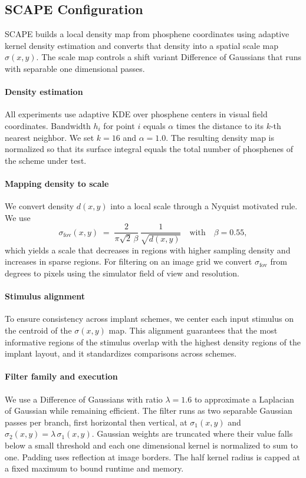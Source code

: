 \subsection{SCAPE Configuration}
SCAPE builds a local density map from phosphene coordinates using adaptive kernel density estimation and converts that density into a spatial scale map \(\sigma(x,y)\). The scale map controls a shift variant Difference of Gaussians that runs with separable one dimensional passes.

\paragraph{Density estimation}
All experiments use adaptive KDE over phosphene centers in visual field coordinates. Bandwidth \(h_i\) for point \(i\) equals \(\alpha\) times the distance to its \(k\)-th nearest neighbor. We set \(k=16\) and \(\alpha=1.0\). The resulting density map is normalized so that its surface integral equals the total number of phosphenes of the scheme under test.

\paragraph{Mapping density to scale}
We convert density \(d(x,y)\) into a local scale through a Nyquist motivated rule. We use
\[
\sigma_{\text{fov}}(x,y) \;=\; \frac{2}{\pi \sqrt{2}\,\beta}\,\frac{1}{\sqrt{d(x,y)}} \quad\text{with}\quad \beta=0.55,
\]
which yields a scale that decreases in regions with higher sampling density and increases in sparse regions. For filtering on an image grid we convert \(\sigma_{\text{fov}}\) from degrees to pixels using the simulator field of view and resolution.

\paragraph{Stimulus alignment}
To ensure consistency across implant schemes, we center each input stimulus on the centroid of the \(\sigma(x,y)\) map. This alignment guarantees that the most informative regions of the stimulus overlap with the highest density regions of the implant layout, and it standardizes comparisons across schemes.

\paragraph{Filter family and execution}
We use a Difference of Gaussians with ratio \(\lambda=1.6\) to approximate a Laplacian of Gaussian while remaining efficient. The filter runs as two separable Gaussian passes per branch, first horizontal then vertical, at \(\sigma_1(x,y)\) and \(\sigma_2(x,y)=\lambda\,\sigma_1(x,y)\). Gaussian weights are truncated where their value falls below a small threshold and each one dimensional kernel is normalized to sum to one. Padding uses reflection at image borders. The half kernel radius is capped at a fixed maximum to bound runtime and memory.

